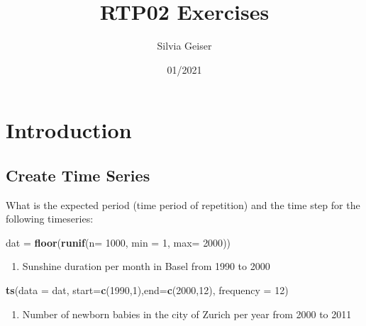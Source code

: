 \documentclass[
]{article}
\title{RTP02 Exercises}
\author{Silvia Geiser}
\date{01/2021}
\newenvironment{Shaded}{\begin{snugshade}}{\end{snugshade}}
\newcommand{\DataTypeTok}[1]{\textcolor[rgb]{0.13,0.29,0.53}{#1}}
\newcommand{\DecValTok}[1]{\textcolor[rgb]{0.00,0.00,0.81}{#1}}
\newcommand{\KeywordTok}[1]{\textcolor[rgb]{0.13,0.29,0.53}{\textbf{#1}}}
\newcommand{\NormalTok}[1]{#1}
\newcommand{\StringTok}[1]{\textcolor[rgb]{0.31,0.60,0.02}{#1}}
\providecommand{\tightlist}{%
  \setlength{\itemsep}{0pt}\setlength{\parskip}{0pt}}
\begin{document}
\maketitle

{
\setcounter{tocdepth}{2}
\tableofcontents
}
\hypertarget{introduction}{%
\section{Introduction}\label{introduction}}

\hypertarget{create-time-series}{%
\subsection{Create Time Series}\label{create-time-series}}

What is the expected period (time period of repetition) and the time
step for the following timeseries:

\begin{Shaded}
\begin{Highlighting}[]
\NormalTok{dat =}\StringTok{ }\KeywordTok{floor}\NormalTok{(}\KeywordTok{runif}\NormalTok{(}\DataTypeTok{n=} \DecValTok{1000}\NormalTok{, }\DataTypeTok{min =} \DecValTok{1}\NormalTok{, }\DataTypeTok{max=} \DecValTok{2000}\NormalTok{))}
\end{Highlighting}
\end{Shaded}

\begin{enumerate}
\def\labelenumi{\alph{enumi})}
\tightlist
\item
  Sunshine duration per month in Basel from 1990 to 2000
\end{enumerate}

\begin{Shaded}
\begin{Highlighting}[]
\KeywordTok{ts}\NormalTok{(}\DataTypeTok{data =}\NormalTok{ dat, }\DataTypeTok{start=}\KeywordTok{c}\NormalTok{(}\DecValTok{1990}\NormalTok{,}\DecValTok{1}\NormalTok{),}\DataTypeTok{end=}\KeywordTok{c}\NormalTok{(}\DecValTok{2000}\NormalTok{,}\DecValTok{12}\NormalTok{), }\DataTypeTok{frequency =} \DecValTok{12}\NormalTok{)}
\end{Highlighting}
\end{Shaded}

\begin{enumerate}
\def\labelenumi{\alph{enumi})}
\setcounter{enumi}{1}
\tightlist
\item
  Number of newborn babies in the city of Zurich per year from 2000 to
  2011
\end{enumerate}
\end{document}
